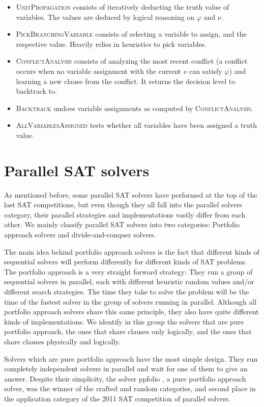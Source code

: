 \documentclass[12pt]{diicc}
\begin{document}
\begin{itemize}
	\item \textsc{UnitPropagation} consists of iteratively deducting the truth value of variables. The values are deduced by logical reasoning on $\varphi$ and $\nu$.
	\item \textsc{PickBranchingVariable} consists of selecting a variable to assign, and the respective value. Heavily relies in heuristics to pick variables.
	\item \textsc{ConflictAnalysis} consists of analyzing the most recent conflict (a conflict occurs when no variable assignment with the current $\nu$ can satisfy $\varphi$) and learning a new clause from the conflict. It returns the decision level to backtrack to.
	\item \textsc{Backtrack} undoes variable assignments as computed by \textsc{ConflictAnalysis}.
	\item \textsc{AllVariablesAssigned} tests whether all variables have been assigned a truth value.
\end{itemize}



\section{Parallel SAT solvers}
As mentioned before, some parallel SAT solvers have performed at the top of the last SAT competitions, but even though they all fall into the parallel solvers category, their parallel strategies and implementations vastly differ from each other. We mainly classify parallel SAT solvers into two categories: Portfolio approach solvers and divide-and-conquer solvers.

The main idea behind portfolio approach solvers is the fact that different kinds of sequential solvers will perform differently for different kinds of SAT problems. The portfolio approach is a very straight forward strategy: They run a group of sequential solvers in parallel, each with different heuristic random values and/or different search strategies. The time they take to solve the problem will be the time of the fastest solver in the group of solvers running in parallel. Although all portfolio approach solvers share this same principle, they also have quite different kinds of implementations. We identify in this group the solvers that are pure portfolio approach, the ones that share clauses only logically, and the ones that share clauses physically and logically.

Solvers which are pure portfolio approach have the most simple design. They run completely independent solvers in parallel and wait for one of them to give an answer. Despite their simplicity, the solver ppfolio \cite{ppfolio}, a pure portfolio approach solver, was the winner of the crafted and random categories, and second place in the application category of the 2011 SAT competition of parallel solvers. 
\end{document}
